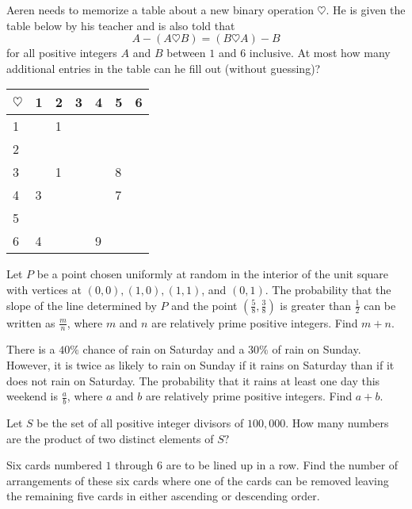 \documentclass{article}
\begin{document}
\begin{prob}{3}
Aeren needs to memorize a table about a new binary operation $\heartsuit$. He is given the table below by his teacher and is also told that
\[A - (A \heartsuit B) = (B \heartsuit A) - B\]for all positive integers $A$ and $B$ between $1$ and $6$ inclusive. At most how many additional entries in the table can he fill out (without guessing)?
\begin{center}
\begin{tabular}{l|llllll} $\heartsuit$ & 1 & 2 & 3 & 4 & 5 & 6 \\ \hline 1 & & 1 & & & & \\ 2 & & & & & & \\ 3 & & 1 & & & 8 & \\ 4 & 3 & & & & 7 & \\ 5 & & & & & & \\ 6 & 4 & & & 9 & & \end{tabular}
\end{center}

\end{prob}

\begin{prob}[AIME II 2020/2]{3}
Let $P$ be a point chosen uniformly at random in the interior of the unit square with vertices at $(0,0), (1,0), (1,1)$, and $(0,1)$. The probability that the slope of the line determined by $P$ and the point $\left(\frac58, \frac38 \right)$ is greater than $\frac12$ can be written as $\frac{m}{n}$, where $m$ and $n$ are relatively prime positive integers. Find $m+n$.
\end{prob}

\begin{prob}[AIME II 2016/2]{4}
There is a $40\%$ chance of rain on Saturday and a $30\%$ of rain on Sunday. However, it is twice as likely to rain on Sunday if it rains on Saturday than if it does not rain on Saturday. The probability that it rains at least one day this weekend is $\frac{a}{b}$, where $a$ and $b$ are relatively prime positive integers. Find $a+b$.
\end{prob}

\begin{prob}[AMC 12B 2019/14]{4}
Let $S$ be the set of all positive integer divisors of $100,000.$ How many numbers are the product of two distinct elements of $S?$
\end{prob}

\begin{prob}[AIME I 2020/5]{4}
Six cards numbered $1$ through $6$ are to be lined up in a row. Find the number of arrangements of these six cards where one of the cards can be removed leaving the remaining five cards in either ascending or descending order.
\end{prob}
\end{document}
